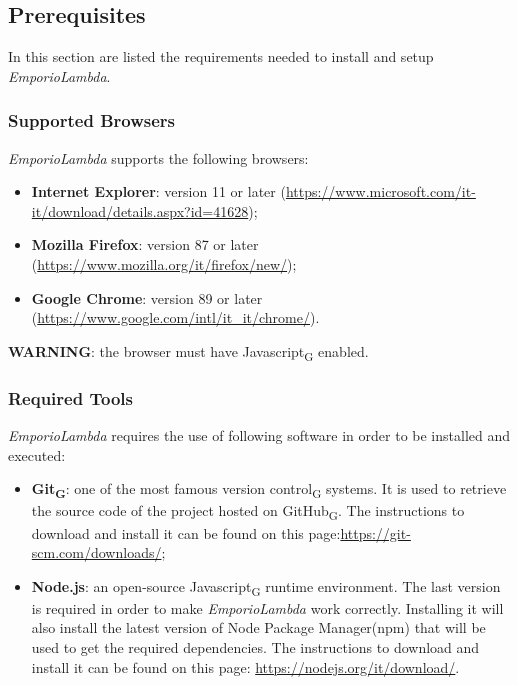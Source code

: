 \subsection{Prerequisites}
In this section are listed the requirements needed to install and setup \textit{EmporioLambda}.

\subsubsection{Supported Browsers}
\textit{EmporioLambda} supports the following browsers:
\begin{itemize}
\item \textbf{Internet Explorer}: version 11 or later (\url{https://www.microsoft.com/it-it/download/details.aspx?id=41628});
\item \textbf{Mozilla Firefox}: version 87 or later (\url{https://www.mozilla.org/it/firefox/new/});
\item \textbf{Google Chrome}: version 89 or later (\url{https://www.google.com/intl/it_it/chrome/}).
\end{itemize}
\textbf{WARNING}: the browser must have Javascript\textsubscript{G} enabled.

\subsubsection{Required Tools}
\textit{EmporioLambda} requires the use of following software in order to be installed and executed:
\begin{itemize}
\item \textbf{Git\textsubscript{G}}: one of the most famous version control\textsubscript{G} systems. It is used to retrieve the source code of the project hosted on GitHub\textsubscript{G}. The instructions to download and install it can be found on this page:\url{https://git-scm.com/downloads/};
\item \textbf{Node.js}: an open-source Javascript\textsubscript{G} runtime environment. The last version is required in order to make \textit{EmporioLambda} work correctly. Installing it will also install the latest version of Node Package Manager(npm) that will be used to get the required dependencies. The instructions to download and install it can be found on this page: \url{https://nodejs.org/it/download/}.
\end{itemize}

